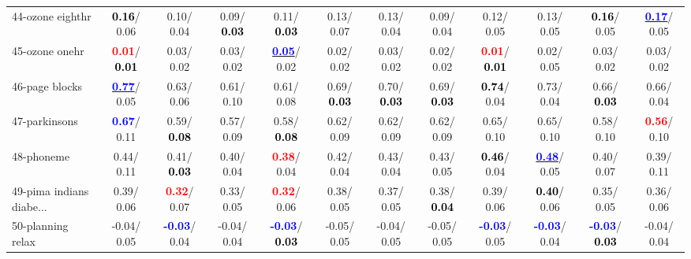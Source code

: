 \begin{table}[h]
\begin{center}
{\begin{tabular}{lc|c|c|c|c|c|c|c|c|c|c}
44-ozone eighthr & \textcolor{black}{\textbf{  0.16}}/  0.06 &   0.10/  0.04 &   0.09/\textcolor{black}{\textbf{  0.03}} &   0.11/\textcolor{black}{\textbf{  0.03}} &   0.13/  0.07 &   0.13/  0.04 &   0.09/  0.04 &   0.12/  0.05 &   0.13/  0.05 & \textcolor{black}{\textbf{  0.16}}/  0.05 & \underline{\textcolor{blue}{\textbf{  0.17}}}/  0.05 \\
45-ozone onehr & \textcolor{red}{\textbf{  0.01}}/\textcolor{black}{\textbf{  0.01}} &   0.03/  0.02 &   0.03/  0.02 & \underline{\textcolor{blue}{\textbf{  0.05}}}/  0.02 &   0.02/  0.02 &   0.03/  0.02 &   0.02/  0.02 & \textcolor{red}{\textbf{  0.01}}/\textcolor{black}{\textbf{  0.01}} &   0.02/  0.05 &   0.03/  0.02 &   0.03/  0.02 \\
46-page blocks & \underline{\textcolor{blue}{\textbf{  0.77}}}/  0.05 &   0.63/  0.06 &   0.61/  0.10 &   0.61/  0.08 &   0.69/\textcolor{black}{\textbf{  0.03}} &   0.70/\textcolor{black}{\textbf{  0.03}} &   0.69/\textcolor{black}{\textbf{  0.03}} & \textcolor{black}{\textbf{  0.74}}/  0.04 &   0.73/  0.04 &   0.66/\textcolor{black}{\textbf{  0.03}} &   0.66/  0.04 \\ \hline
47-parkinsons & \textcolor{blue}{\textbf{  0.67}}/  0.11 &   0.59/\textcolor{black}{\textbf{  0.08}} &   0.57/  0.09 &   0.58/\textcolor{black}{\textbf{  0.08}} &   0.62/  0.09 &   0.62/  0.09 &   0.62/  0.09 &   0.65/  0.10 &   0.65/  0.10 &   0.58/  0.10 & \textcolor{red}{\textbf{  0.56}}/  0.10 \\
48-phoneme &   0.44/  0.11 &   0.41/\textcolor{black}{\textbf{  0.03}} &   0.40/  0.04 & \textcolor{red}{\textbf{  0.38}}/  0.04 &   0.42/  0.04 &   0.43/  0.04 &   0.43/  0.05 & \textcolor{black}{\textbf{  0.46}}/  0.04 & \underline{\textcolor{blue}{\textbf{  0.48}}}/  0.05 &   0.40/  0.07 &   0.39/  0.11 \\
49-pima indians diabe... &   0.39/  0.06 & \textcolor{red}{\textbf{  0.32}}/  0.07 &   0.33/  0.05 & \textcolor{red}{\textbf{  0.32}}/  0.06 &   0.38/  0.05 &   0.37/  0.05 &   0.38/\textcolor{black}{\textbf{  0.04}} &   0.39/  0.06 & \textcolor{black}{\textbf{  0.40}}/  0.06 &   0.35/  0.05 &   0.36/  0.06 \\
50-planning relax &  -0.04/  0.05 & \textcolor{blue}{\textbf{ -0.03}}/  0.04 &  -0.04/  0.04 & \textcolor{blue}{\textbf{ -0.03}}/\textcolor{black}{\textbf{  0.03}} &  -0.05/  0.05 &  -0.04/  0.05 &  -0.05/  0.05 & \textcolor{blue}{\textbf{ -0.03}}/  0.05 & \textcolor{blue}{\textbf{ -0.03}}/  0.04 & \textcolor{blue}{\textbf{ -0.03}}/\textcolor{black}{\textbf{  0.03}} &  -0.04/  0.04 \\

\end{tabular}}
\end{center}
\end{table}
